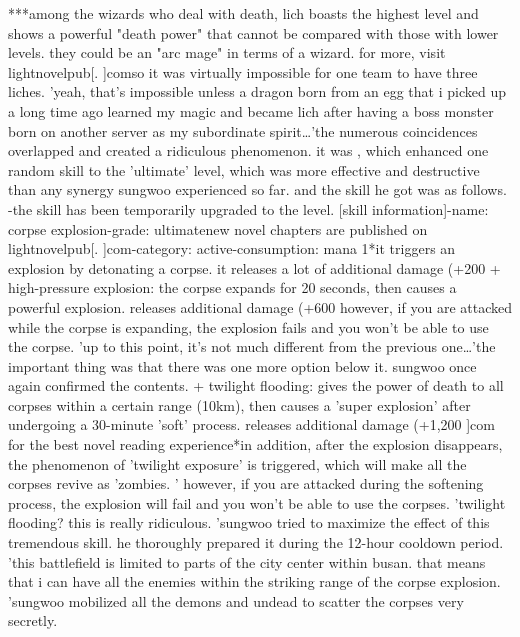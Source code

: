 ***among the wizards who deal with death, lich boasts the highest level and shows a powerful "death power" that cannot be compared with those with lower levels.
 they could be an "arc mage" in terms of a wizard.
for more, visit lightnovelpub[.
]comso it was virtually impossible for one team to have three liches.
'yeah, that's impossible unless a dragon born from an egg that i picked up a long time ago learned my magic and became lich after having a boss monster born on another server as my subordinate spirit…'the numerous coincidences overlapped and created a ridiculous phenomenon.
it was , which enhanced one random skill to the 'ultimate' level, which was more effective and destructive than any synergy sungwoo experienced so far.
and the skill he got was as follows.
-the  skill has been temporarily upgraded to the  level.
[skill information]-name: corpse explosion-grade: ultimatenew novel chapters are published on lightnovelpub[.
]com-category: active-consumption: mana 1*it triggers an explosion by detonating a corpse.
 it releases a lot of additional damage (+200%
+ high-pressure explosion: the corpse expands for 20 seconds, then causes a powerful explosion.
 releases additional damage (+600%
however, if you are attacked while the corpse is expanding, the explosion fails and you won't be able to use the corpse.
'up to this point, it's not much different from the previous one…'the important thing was that there was one more option below it.
 sungwoo once again confirmed the contents.
+ twilight flooding: gives the power of death to all corpses within a certain range (10km), then causes a 'super explosion' after undergoing a 30-minute 'soft' process.
 releases additional damage (+1,200%
]com for the best novel reading experience*in addition, after the explosion disappears, the phenomenon of 'twilight exposure' is triggered, which will make all the corpses revive as 'zombies.
' however, if you are attacked during the softening process, the explosion will fail and you won't be able to use the corpses.
'twilight flooding? this is really ridiculous.
'sungwoo tried to maximize the effect of this tremendous skill.
 he thoroughly prepared it during the 12-hour cooldown period.
'this battlefield is limited to parts of the city center within busan.
 that means that i can have all the enemies within the striking range of the corpse explosion.
'sungwoo mobilized all the demons and undead to scatter the corpses very secretly.
